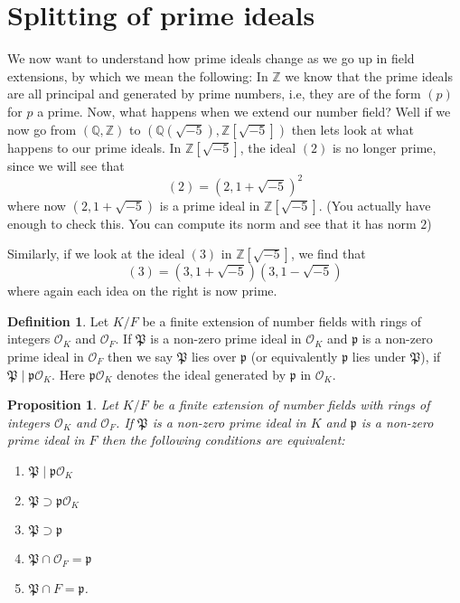 \documentclass[11pt,a4paper]{report}
\theoremstyle{plain}
\newtheorem{prop}[subsection]{Proposition}
\theoremstyle{definition}
\newtheorem{definition}[subsection]{Definition}
\theoremstyle{definition}
\newcommand{\ZZ}{\mathbb{Z}}
\def\QQ{\mathbb{Q}}
\def\gothp{\mathfrak{p}}
\def \OO {\mathcal{O}}
\begin{document}
	
	\section{Splitting of prime ideals}
	
	
	We now want to understand how prime ideals change as we go up in field extensions, by which we mean the following: In $\ZZ$ we know that the prime ideals are all principal and generated by prime numbers, i.e, they are of the form $(p)$ for $p$ a prime. Now, what happens when we extend our number field? Well if we now go from $(\QQ,\ZZ)$ to $(\QQ(\sqrt{-5}),\ZZ[\sqrt{-5}])$ then lets look at what happens to our prime ideals. In $\ZZ[\sqrt{-5}]$, the ideal $(2)$ is no longer prime, since we will see that \[(2)=(2,1+\sqrt{-5})^2\] where now $(2,1+\sqrt{-5})$ is a prime ideal in $\ZZ[\sqrt{-5}]$. (You actually have enough to check this. You can compute its norm and see that it has norm $2$)
	
	Similarly, if we look at the ideal $(3)$ in $\ZZ[\sqrt{-5}]$, we find that \[(3)=(3,1+\sqrt{-5})(3,1-\sqrt{-5})\] where again each idea on the right is now prime. 
	
	\begin{definition}
		Let $K/F$ be a finite extension of number fields with rings of integers $\OO_K$ and $\OO_F$. If $\mathfrak{P}$ is a non-zero prime ideal in $\OO_K$ and $\gothp$ is a non-zero prime ideal in $\OO_F$ then we say $\mathfrak{P}$ lies over $\gothp$ (or equivalently $\gothp$ lies under $\mathfrak{P}$), if $\mathfrak{P} \mid \gothp\OO_K$. Here $\gothp\OO_K$ denotes the ideal generated by $\gothp$ in $\OO_K$.
	\end{definition}
	
	
	\begin{prop}\label{prop: prime above}
		Let $K/F$ be a finite extension of number fields with rings of integers $\OO_K$ and $\OO_F$. If $\mathfrak{P}$ is a non-zero prime ideal in $K$ and $\gothp$ is a non-zero prime ideal in $F$  then the following conditions are equivalent:
		
		\begin{enumerate}[(1)]
			\item $\mathfrak{P} \mid \gothp\OO_K$
			\item $\mathfrak{P} \supset \gothp\OO_K$
			\item $\mathfrak{P} \supset \gothp$
			\item $\mathfrak{P} \cap \OO_F=\gothp$
			\item $\mathfrak{P} \cap F=\gothp$.
		\end{enumerate}
		
	\end{prop}
	
\end{document}

